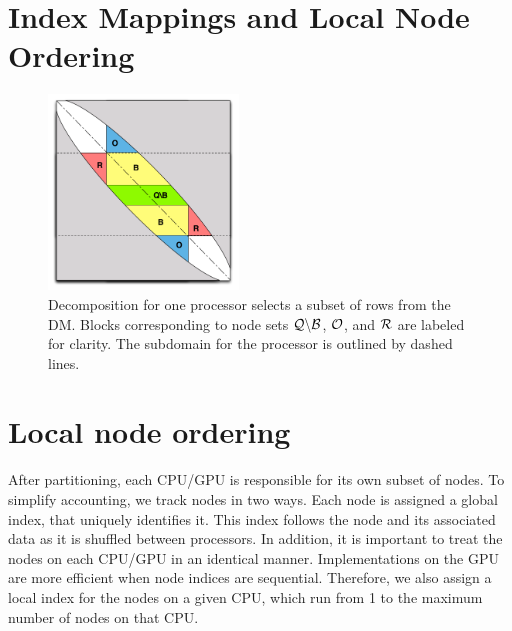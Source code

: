 \documentclass{report}
\begin{document}




\section{Index Mappings and Local Node Ordering}


\begin{figure}
\begin{center}
\includegraphics[width=0.45\textwidth]{rbffd_methods_content/decompositions/MatrixDecompositionSets_RBF-FD_Bowed.pdf} 
\caption{Decomposition for one processor selects a subset of rows from the DM. Blocks corresponding to node sets $\mathcal{Q} \backslash \mathcal{B}$, $\mathcal{O}$, and $\mathcal{R}$ are labeled for clarity. The subdomain for the processor is outlined by dashed lines.}
\label{fig:decomp_matrix_view}
\end{center}
\end{figure}



\section{Local node ordering}

After partitioning, each CPU/GPU is responsible for its own subset of nodes. 
To simplify accounting, we track nodes in two ways. Each node is assigned
a global index, that uniquely identifies it. This index follows the node 
and its associated data as it is shuffled between processors. In addition, 
it is important to treat the nodes on each CPU/GPU in an identical manner. 
Implementations on the GPU are more efficient when node indices
are sequential. Therefore, we also assign a local index for the nodes on 
a given CPU, which run from 1 to the maximum number of nodes on that CPU. 
\end{document}
